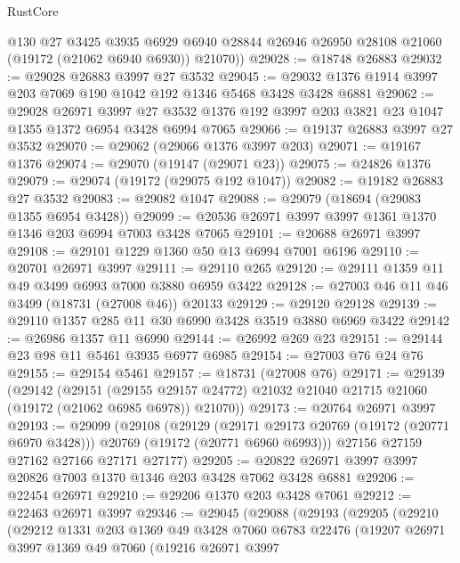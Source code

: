 \begin{lexlean}{RustCore}
\begin{coremodule}
        @130
        @27
        @3425
        @3935
        @6929
        @6940
        @28844
        @26946
        @26950
        @28108
        @21060
        (@19172 (@21062 @6940 @6930))
        @21070))
@29028 := @18748 @26883
@29032 := @29028 @26883 @3997 @27 @3532
@29045 := @29032 @1376 @1914 @3997 @203 @7069 @190 @1042 @192 @1346 @5468 @3428 @3428 @6881
@29062 := @29028
    @26971
    @3997
    @27
    @3532
    @1376
    @192
    @3997
    @203
    @3821
    @23
    @1047
    @1355
    @1372
    @6954
    @3428
    @6994
    @7065
@29066 := @19137 @26883 @3997 @27 @3532
@29070 := @29062 (@29066 @1376 @3997 @203)
@29071 := @19167 @1376
@29074 := @29070 (@19147 (@29071 @23))
@29075 := @24826 @1376
@29079 := @29074 (@19172 (@29075 @192 @1047))
@29082 := @19182 @26883 @27 @3532
@29083 := @29082 @1047
@29088 := @29079 (@18694 (@29083 @1355 @6954 @3428))
@29099 := @20536 @26971 @3997 @3997 @1361 @1370 @1346 @203 @6994 @7003 @3428 @7065
@29101 := @20688 @26971 @3997
@29108 := @29101 @1229 @1360 @50 @13 @6994 @7001 @6196
@29110 := @20701 @26971 @3997
@29111 := @29110 @265
@29120 := @29111 @1359 @11 @49 @3499 @6993 @7000 @3880 @6959 @3422
@29128 := @27003 @46 @11 @46 @3499 (@18731 (@27008 @46)) @20133
@29129 := @29120 @29128
@29139 := @29110 @1357 @285 @11 @30 @6990 @3428 @3519 @3880 @6969 @3422
@29142 := @26986 @1357 @11 @6990
@29144 := @26992 @269 @23
@29151 := @29144 @23 @98 @11 @5461 @3935 @6977 @6985
@29154 := @27003 @76 @24 @76
@29155 := @29154 @5461
@29157 := @18731 (@27008 @76)
@29171 := @29139
    (@29142
      (@29151
        (@29155 @29157 @24772)
        @21032
        @21040
        @21715
        @21060
        (@19172 (@21062 @6985 @6978))
        @21070))
@29173 := @20764 @26971 @3997
@29193 := @29099
    (@29108
      (@29129
        (@29171 @29173 @20769 (@19172 (@20771 @6970 @3428)))
        @20769
        (@19172 (@20771 @6960 @6993)))
      @27156
      @27159
      @27162
      @27166
      @27171
      @27177)
@29205 := @20822 @26971 @3997 @3997 @20826 @7003 @1370 @1346 @203 @3428 @7062 @3428 @6881
@29206 := @22454 @26971
@29210 := @29206 @1370 @203 @3428 @7061
@29212 := @22463 @26971 @3997
@29346 := @29045
    (@29088
      (@29193
        (@29205
          (@29210
            (@29212
              @1331
              @203
              @1369
              @49
              @3428
              @7060
              @6783
              @22476
              (@19207
                @26971
                @3997
                @1369
                @49
                @7060
                (@19216
                  @26971
                  @3997

\end{coremodule}
\end{lexlean}
